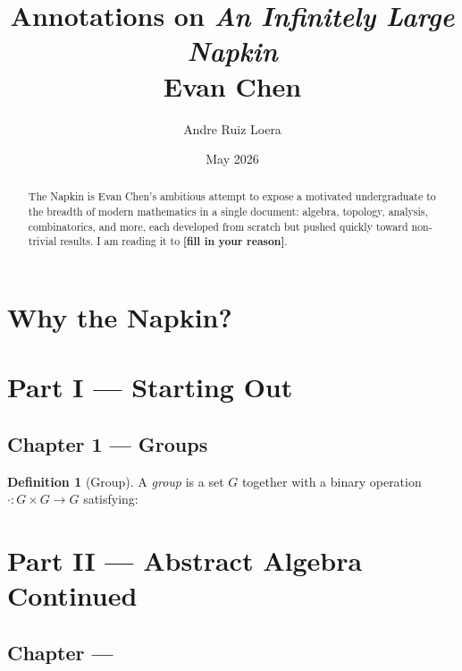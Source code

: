 \documentclass[11pt, letterpaper]{article}
\title{Annotations on \textit{An Infinitely Large Napkin} \\ \large Evan Chen}
\author{Andre Ruiz Loera}
\date{May 2026}
\theoremstyle{definition}
\newtheorem{definition}[theorem]{Definition}
\theoremstyle{remark}
\begin{document}
\maketitle

\begin{abstract}
  The Napkin is Evan Chen's ambitious attempt to expose a motivated undergraduate to
  the breadth of modern mathematics in a single document: algebra, topology, analysis,
  combinatorics, and more, each developed from scratch but pushed quickly toward
  non-trivial results. I am reading it to \textbf{[fill in your reason]}.
\end{abstract}

\tableofcontents
\newpage

\section{Why the Napkin?}


\section{Part I — Starting Out}

\subsection{Chapter 1 — Groups}

\begin{definition}[Group]
  A \emph{group} is a set $G$ together with a binary operation $\cdot : G \times G \to G$
  satisfying: %
\end{definition}



\section{Part II — Abstract Algebra Continued}

\subsection{Chapter — }
\end{document}
